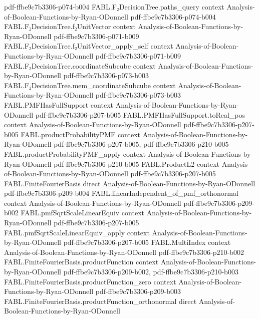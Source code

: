 \begin{theorem}
  {pdf-ffbe9c7b3306-p074-b004}
\proofstep
  {FABL.F₂DecisionTree.paths_query}
  {context}
  {Analysis-of-Boolean-Functions-by-Ryan-ODonnell}
  {pdf-ffbe9c7b3306-p074-b004}
\proofstep
  {FABL.F₂DecisionTree.f₂UnitVector}
  {context}
  {Analysis-of-Boolean-Functions-by-Ryan-ODonnell}
  {pdf-ffbe9c7b3306-p071-b009}
\proofstep
  {FABL.F₂DecisionTree.f₂UnitVector_apply_self}
  {context}
  {Analysis-of-Boolean-Functions-by-Ryan-ODonnell}
  {pdf-ffbe9c7b3306-p071-b009}
\proofstep
  {FABL.F₂DecisionTree.coordinateSubcube}
  {context}
  {Analysis-of-Boolean-Functions-by-Ryan-ODonnell}
  {pdf-ffbe9c7b3306-p073-b003}
\proofstep
  {FABL.F₂DecisionTree.mem_coordinateSubcube}
  {context}
  {Analysis-of-Boolean-Functions-by-Ryan-ODonnell}
  {pdf-ffbe9c7b3306-p073-b003}
\proofstep
  {FABL.PMFHasFullSupport}
  {context}
  {Analysis-of-Boolean-Functions-by-Ryan-ODonnell}
  {pdf-ffbe9c7b3306-p207-b005}
\proofstep
  {FABL.PMFHasFullSupport.toReal_pos}
  {context}
  {Analysis-of-Boolean-Functions-by-Ryan-ODonnell}
  {pdf-ffbe9c7b3306-p207-b005}
\proofstep
  {FABL.productProbabilityPMF}
  {context}
  {Analysis-of-Boolean-Functions-by-Ryan-ODonnell}
  {pdf-ffbe9c7b3306-p207-b005,
    pdf-ffbe9c7b3306-p210-b005}
\proofstep
  {FABL.productProbabilityPMF_apply}
  {context}
  {Analysis-of-Boolean-Functions-by-Ryan-ODonnell}
  {pdf-ffbe9c7b3306-p210-b005}
\proofstep
  {FABL.ProductL2}
  {context}
  {Analysis-of-Boolean-Functions-by-Ryan-ODonnell}
  {pdf-ffbe9c7b3306-p207-b005}
\proofstep
  {FABL.FiniteFourierBasis}
  {direct}
  {Analysis-of-Boolean-Functions-by-Ryan-ODonnell}
  {pdf-ffbe9c7b3306-p209-b004}
\proofstep
  {FABL.linearIndependent_of_pmf_orthonormal}
  {context}
  {Analysis-of-Boolean-Functions-by-Ryan-ODonnell}
  {pdf-ffbe9c7b3306-p209-b002}
\proofstep
  {FABL.pmfSqrtScaleLinearEquiv}
  {context}
  {Analysis-of-Boolean-Functions-by-Ryan-ODonnell}
  {pdf-ffbe9c7b3306-p207-b005}
\proofstep
  {FABL.pmfSqrtScaleLinearEquiv_apply}
  {context}
  {Analysis-of-Boolean-Functions-by-Ryan-ODonnell}
  {pdf-ffbe9c7b3306-p207-b005}
\proofstep
  {FABL.MultiIndex}
  {context}
  {Analysis-of-Boolean-Functions-by-Ryan-ODonnell}
  {pdf-ffbe9c7b3306-p210-b002}
\proofstep
  {FABL.FiniteFourierBasis.productFunction}
  {context}
  {Analysis-of-Boolean-Functions-by-Ryan-ODonnell}
  {pdf-ffbe9c7b3306-p209-b002,
    pdf-ffbe9c7b3306-p210-b003}
\proofstep
  {FABL.FiniteFourierBasis.productFunction_zero}
  {context}
  {Analysis-of-Boolean-Functions-by-Ryan-ODonnell}
  {pdf-ffbe9c7b3306-p209-b003}
\proofstep
  {FABL.FiniteFourierBasis.productFunction_orthonormal}
  {direct}
  {Analysis-of-Boolean-Functions-by-Ryan-ODonnell}

\end{theorem}
